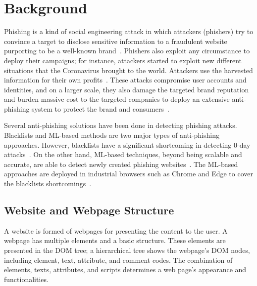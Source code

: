 
\section{Background}
\label{s:background}

Phishing is a kind of social engineering attack in which attackers (phishers) try to convince a target to disclose sensitive information to a fraudulent website purporting to be a well-known brand~\cite{dodge2007phishing,holz2009learning,mcgrath2008behind}. Phishers also exploit any circumstance to deploy their campaigns; for instance, attackers started to exploit new different situations that the Coronavirus brought to the world\cite{bitaab2020scampandamic}.
Attackers use the harvested information for their own profits~\cite{sood2013crimeware,aleroud2017phishing}.
These attacks compromise user accounts and identities, and on a larger scale, they also damage the targeted brand reputation and burden massive cost to the targeted companies to deploy an extensive anti-phishing system to protect the brand and consumers~\cite{hong2012state}.

Several anti-phishing solutions have been done in detecting phishing attacks. Blacklists and ML-based methods are two major types of anti-phishing approaches. However, blacklists have a significant shortcoming in detecting 0-day attacks~\cite{oest2019phishfarm}. 
On the other hand, ML-based techniques, beyond being scalable and accurate, are able to detect newly created phishing websites~\cite{whittaker2010large}.
The ML-based approaches are deployed in industrial browsers such as Chrome and Edge to cover the blacklists shortcomings~\cite{safebrowsing,mjcaparas}.

\subsection{Website and Webpage Structure}
A website is formed of webpages for presenting the content to the user. A webpage has multiple elements and a basic structure. These elements are presented in the DOM tree; a hierarchical tree shows the webpage's DOM nodes, including element, text, attribute, and comment codes.
The combination of elements, texts, attributes, and scripts determines a web page's appearance and functionalities.

